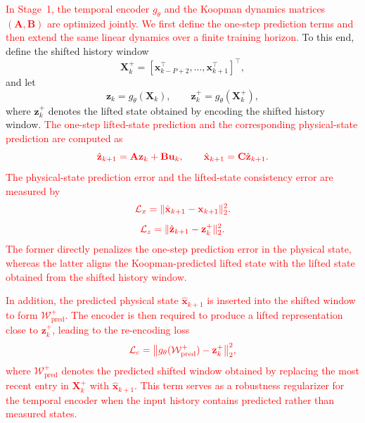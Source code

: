 \documentclass[journal]{IEEEtran}
\newcommand{\vx}{\mathbf{x}}
\newcommand{\vu}{\mathbf{u}}
\newcommand{\vz}{\mathbf{z}}
\newcommand{\mA}{\mathbf{A}}
\newcommand{\mB}{\mathbf{B}}
\newcommand{\mC}{\mathbf{C}}
\newcommand{\mX}{\mathbf{X}}
\begin{document}
\textcolor{red}{In Stage~1, the temporal encoder $g_\theta$ and the Koopman dynamics matrices $(\mA,\mB)$ are optimized jointly. We first define the one-step prediction terms and then extend the same linear dynamics over a finite training horizon.} To this end, define the shifted history window
\begin{equation}
    \mX_k^{+} = [\vx_{k-P+2}^\top,\ldots,\vx_{k+1}^\top]^\top,
\end{equation}
and let
\begin{equation}
    \vz_k = g_\theta(\mX_k), \qquad
    \vz_k^{+} = g_\theta(\mX_k^{+}),
\end{equation}
where $\vz_k^{+}$ denotes the lifted state obtained by encoding the shifted history window. \textcolor{red}{The one-step lifted-state prediction and the corresponding physical-state prediction are computed as}
\begin{equation}
    \color{red}
    \hat{\vz}_{k+1} = \mA \vz_k + \mB \vu_k,
    \qquad
    \hat{\vx}_{k+1} = \mC \hat{\vz}_{k+1}.
\end{equation}
\textcolor{red}{The physical-state prediction error and the lifted-state consistency error are measured by}
\begin{equation}
    \color{red}
    \mathcal{L}_{x}
    =
    \|\hat{\vx}_{k+1}-\vx_{k+1}\|_2^2.
    \label{eq:loss_x}
\end{equation}
\begin{equation}
    \color{red}
    \mathcal{L}_{z}
    =
    \|\hat{\vz}_{k+1}-\vz_k^{+}\|_2^2.
    \label{eq:loss_z}
\end{equation}
\textcolor{red}{The former directly penalizes the one-step prediction error in the physical state, whereas the latter aligns the Koopman-predicted lifted state with the lifted state obtained from the shifted history window.}

\textcolor{red}{In addition, the predicted physical state $\hat{\vx}_{k+1}$ is inserted into the shifted window to form $\mathcal{W}^{+}_{\mathrm{pred}}$. The encoder is then required to produce a lifted representation close to $\vz_k^{+}$, leading to the re-encoding loss}
\begin{equation}
    \color{red}
    \mathcal{L}_{c} =
    \bigl\|g_\theta(\mathcal{W}^{+}_{\mathrm{pred}})-\vz_k^{+}\bigr\|_2^2,
    \label{eq:loss_c}
\end{equation}
\textcolor{red}{where $\mathcal{W}^{+}_{\mathrm{pred}}$ denotes the predicted shifted window obtained by replacing the most recent entry in $\mX_k^{+}$ with $\hat{\vx}_{k+1}$. This term serves as a robustness regularizer for the temporal encoder when the input history contains predicted rather than measured states.}
\end{document}
